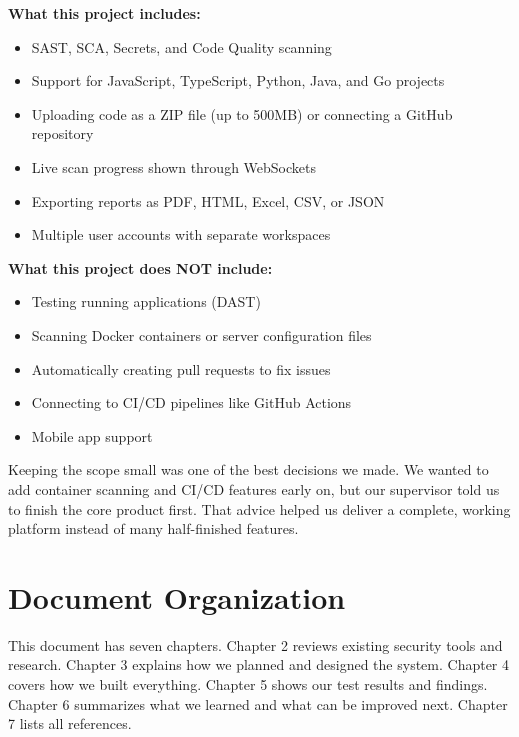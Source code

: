\documentclass[12pt,a4paper]{report}
\begin{document}
\textbf{What this project includes:}
\begin{itemize}
    \item SAST, SCA, Secrets, and Code Quality scanning
    \item Support for JavaScript, TypeScript, Python, Java, and Go projects
    \item Uploading code as a ZIP file (up to 500MB) or connecting a GitHub repository
    \item Live scan progress shown through WebSockets
    \item Exporting reports as PDF, HTML, Excel, CSV, or JSON
    \item Multiple user accounts with separate workspaces
\end{itemize}

\textbf{What this project does NOT include:}
\begin{itemize}
    \item Testing running applications (DAST)
    \item Scanning Docker containers or server configuration files
    \item Automatically creating pull requests to fix issues
    \item Connecting to CI/CD pipelines like GitHub Actions
    \item Mobile app support
\end{itemize}

\begin{lessonbox}
Keeping the scope small was one of the best decisions we made. We wanted to add container scanning and CI/CD features early on, but our supervisor told us to finish the core product first. That advice helped us deliver a complete, working platform instead of many half-finished features.
\end{lessonbox}

\section{Document Organization}

This document has seven chapters. Chapter 2 reviews existing security tools and research. Chapter 3 explains how we planned and designed the system. Chapter 4 covers how we built everything. Chapter 5 shows our test results and findings. Chapter 6 summarizes what we learned and what can be improved next. Chapter 7 lists all references.

\end{document}
